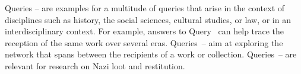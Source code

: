 %
Queries -- are examples for a multitude of queries that arise
in the context of disciplines such as history, the social sciences, cultural studies, or law,
or in an interdisciplinary context.
For example, answers to
Query~ can help trace the reception
of the same work over several eras.
Queries~--
aim at exploring the network
that spans between the recipients of a work or collection.
Queries~-- are relevant for research on Nazi loot and restitution.

%
%

%
%

